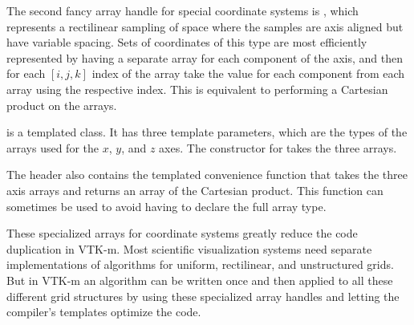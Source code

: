 


The second fancy array handle for special coordinate systems is
, which represents a rectilinear
sampling of space where the samples are axis aligned but have variable
spacing. Sets of coordinates of this type are most efficiently represented
by having a separate array for each component of the axis, and then for
each $[i,j,k]$ index of the array take the value for each component from
each array using the respective index. This is equivalent to performing a
Cartesian product on the arrays.

 is a templated class. It has
three template parameters, which are the types of the arrays used for the
$x$, $y$, and $z$ axes. The constructor for
 takes the three arrays.


The  header also
contains the templated convenience function
 that takes the three axis
arrays and returns an array of the Cartesian product. This function can
sometimes be used to avoid having to declare the full array type.



\begin{didyouknow}
  These specialized arrays for coordinate systems greatly reduce the code
  duplication in VTK-m. Most scientific visualization systems need separate
  implementations of algorithms for uniform, rectilinear, and unstructured
  grids. But in VTK-m an algorithm can be written once and then applied to
  all these different grid structures by using these specialized array
  handles and letting the compiler's templates optimize the code.
\end{didyouknow}

